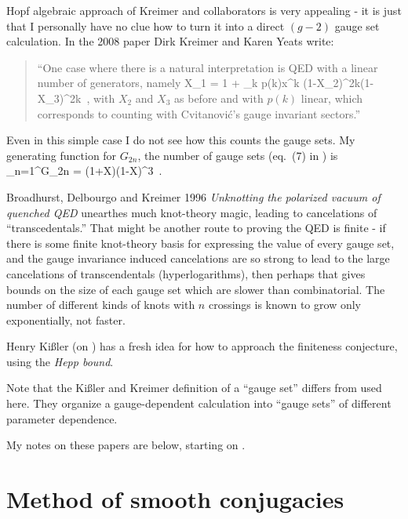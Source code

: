 Hopf algebraic approach of Kreimer and collaborators is very appealing - it is just that I
personally have no clue how to turn it into a direct $(g-2)$ gauge set
calculation. In the 2008 paper
 {Dirk Kreimer} and
{Karen Yeats} write:
    \begin{quote}
``One case where there is a natural interpretation is QED with a linear
number of generators, namely
\beq
X_1 = 1 + \sum_{k }p(k)x^k
           {(1-X_2)^{2k}(1-X_3)^{2k}}
\,,
with $X_2$ and $X_3$ as before and with $p(k)$ linear, which corresponds
to counting with Cvitanovi\'c's gauge invariant sectors.''
    \end{quote}
Even in this simple case I do not see how this counts the gauge sets. My
generating function for $G_{2n}$, the number of gauge sets
(eq.~(7) in )  is
\beq
\sum_{n=1}^\infty G_{2n}
    =
           {(1+X)(1-X)^{3}}
\,.

Broadhurst, Delbourgo and Kreimer 1996 {\em Unknotting the
polarized vacuum of quenched {QED}} unearthes much knot-theory magic,
leading to cancelations of ``transcedentals.'' That might be another
route to proving the QED is finite - if there is some finite knot-theory
basis for expressing the value of every gauge set, and the gauge
invariance induced cancelations are so strong to lead to the large
cancelations of transcendentals (hyperlogarithms), then perhaps that
gives bounds on the size of each gauge set which are slower than
combinatorial. The number of different kinds of knots with $n$ crossings
is known to grow only exponentially, not faster.

Henry Ki{\ss}ler (on ) has a fresh idea for how to
approach the finiteness conjecture, using the \emph{Hepp bound}.

Note that the Ki{\ss}ler and Kreimer definition of a ``gauge
set'' differs from  used here. They organize a
gauge-dependent calculation into ``gauge sets'' of different parameter
dependence.

My notes on these papers are below, starting on .

\section{Method of smooth conjugacies}
\label{sect:scfpo}

